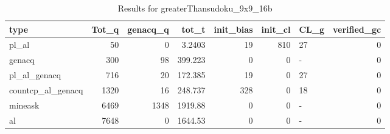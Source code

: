 \begin{table}[ht]
\caption{Results for greaterThansudoku_9x9_16b}
\begin{tabular}{lrrrrrlr}
\hline
 type              &   Tot\_q &   genacq\_q &     tot\_t &   init\_bias &   init\_cl & CL\_g   &   verified\_gc \\
\hline
 pl\_al             &      50 &          0 &    3.2403 &          19 &       810 & 27     &             0 \\
 genacq            &     300 &         98 &  399.223  &           0 &         0 & -      &             0 \\
 pl\_al\_genacq      &     716 &         20 &  172.385  &          19 &         0 & 27     &             0 \\
 countcp\_al\_genacq &    1320 &         16 &  248.737  &         328 &         0 & 18     &             0 \\
 mineask           &    6469 &       1348 & 1919.88   &           0 &         0 & -      &             0 \\
 al                &    7648 &          0 & 1644.53   &           0 &         0 & -      &             0 \\
\hline
\end{tabular}
\end{table}